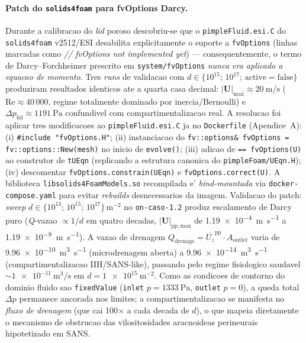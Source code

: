 \paragraph{Patch do \texttt{solids4foam} para fvOptions Darcy.} Durante a calibracao do \emph{lid} poroso descobriu-se que o \texttt{pimpleFluid.esi.C} do \texttt{solids4foam} v2512/ESI desabilita explicitamente o suporte a \texttt{fvOptions} (linhas marcadas como \emph{// fvOptions not implemented yet}) --- consequentemente, o termo de Darcy--Forchheimer prescrito em \texttt{system/fvOptions} \emph{nunca era aplicado a equacao de momento}. Tres \emph{runs} de validacao com $d \in \{10^{15};\, 10^{17};\, \mathrm{active=false}\}$ produziram resultados identicos ate a quarta casa decimal: $|\bm{U}|_{\max} \approx \SI{20}{\meter\per\second}$ ($\mathrm{Re} \approx 40\,000$, regime totalmente dominado por inercia/Bernoulli) e $\Delta p_{\mathrm{lid}} \approx \SI{1191}{\pascal}$ confundivel com compartimentalizacao real. A resolucao foi aplicar tres modificacoes ao \texttt{pimpleFluid.esi.C} ja no \texttt{Dockerfile} (Apendice~A): (i) \texttt{\#include "fvOptions.H"}; (ii) instanciacao do \texttt{fv::options\& fvOptions = fv::options::New(mesh)} no inicio de \texttt{evolve()}; (iii) adicao de \texttt{== fvOptions(U)} ao construtor de \texttt{tUEqn} (replicando a estrutura canonica do \texttt{pimpleFoam/UEqn.H}); (iv) descomentar \texttt{fvOptions.constrain(UEqn)} e \texttt{fvOptions.correct(U)}. A biblioteca \texttt{libsolids4FoamModels.so} recompilada e' \emph{bind-mountada} via \texttt{docker-compose.yaml} para evitar \emph{rebuilds} desnecessarios da imagem. Validacao do patch: \emph{sweep} $d \in \{10^{13};\, 10^{15};\, 10^{17}\}\,\si{\meter^{-2}}$ no \texttt{on-caso-1.2} produz escalamento de Darcy puro (\emph{Q}-vazao $\propto 1/d$ em quatro decadas, $|\bm{U}|_{\mathrm{pp,max}}$ de \SI{1.19e-4}{\meter\per\second} a \SI{1.19e-8}{\meter\per\second}). A vazao de drenagem $Q_{\mathrm{drenage}} = \overline{U_z}^{\mathrm{pp}} \cdot A_{\mathrm{outlet}}$ varia de \SI{9.96e-10}{\meter^3\per\second} (microdrenagem aberta) a \SI{9.96e-14}{\meter^3\per\second} (compartimentalizacao IIH/SANS-like), passando pelo regime fisiologico saudavel $\sim \SI{1e-11}{\meter^3\per\second}$ em $d = \SI{1e15}{\meter^{-2}}$. Como as condicoes de contorno do dominio fluido sao \texttt{fixedValue} (\texttt{inlet} $p = \SI{1333}{\pascal}$, \texttt{outlet} $p = 0$), a queda total $\Delta p$ permanece ancorada nos limites; a compartimentalizacao se manifesta no \emph{fluxo de drenagem} (que cai 100$\times$ a cada decada de $d$), o que mapeia diretamente o mecanismo de obstrucao das vilositosidades aracnoideas perineurais hipotetizado em SANS.

